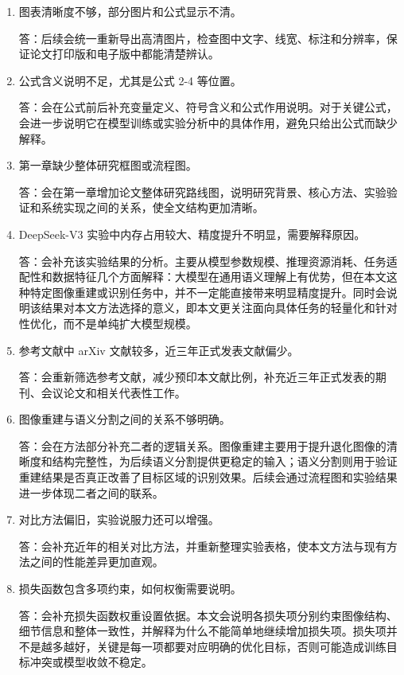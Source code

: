 \documentclass[UTF8,a4paper,12pt,fontset=fandol]{ctexart}
\begin{document}
\thispagestyle{empty}

\begin{enumerate}[leftmargin=2em,itemsep=1.1em]
\item 图表清晰度不够，部分图片和公式显示不清。

答：后续会统一重新导出高清图片，检查图中文字、线宽、标注和分辨率，保证论文打印版和电子版中都能清楚辨认。

\item 公式含义说明不足，尤其是公式 2-4 等位置。

答：会在公式前后补充变量定义、符号含义和公式作用说明。对于关键公式，会进一步说明它在模型训练或实验分析中的具体作用，避免只给出公式而缺少解释。

\item 第一章缺少整体研究框图或流程图。

答：会在第一章增加论文整体研究路线图，说明研究背景、核心方法、实验验证和系统实现之间的关系，使全文结构更加清晰。

\item DeepSeek-V3 实验中内存占用较大、精度提升不明显，需要解释原因。

答：会补充该实验结果的分析。主要从模型参数规模、推理资源消耗、任务适配性和数据特征几个方面解释：大模型在通用语义理解上有优势，但在本文这种特定图像重建或识别任务中，并不一定能直接带来明显精度提升。同时会说明该结果对本文方法选择的意义，即本文更关注面向具体任务的轻量化和针对性优化，而不是单纯扩大模型规模。

\item 参考文献中 arXiv 文献较多，近三年正式发表文献偏少。

答：会重新筛选参考文献，减少预印本文献比例，补充近三年正式发表的期刊、会议论文和相关代表性工作。

\item 图像重建与语义分割之间的关系不够明确。

答：会在方法部分补充二者的逻辑关系。图像重建主要用于提升退化图像的清晰度和结构完整性，为后续语义分割提供更稳定的输入；语义分割则用于验证重建结果是否真正改善了目标区域的识别效果。后续会通过流程图和实验结果进一步体现二者之间的联系。

\item 对比方法偏旧，实验说服力还可以增强。

答：会补充近年的相关对比方法，并重新整理实验表格，使本文方法与现有方法之间的性能差异更加直观。

\item 损失函数包含多项约束，如何权衡需要说明。

答：会补充损失函数权重设置依据。本文会说明各损失项分别约束图像结构、细节信息和整体一致性，并解释为什么不能简单地继续增加损失项。损失项并不是越多越好，关键是每一项都要对应明确的优化目标，否则可能造成训练目标冲突或模型收敛不稳定。


\end{enumerate}
\end{document}
